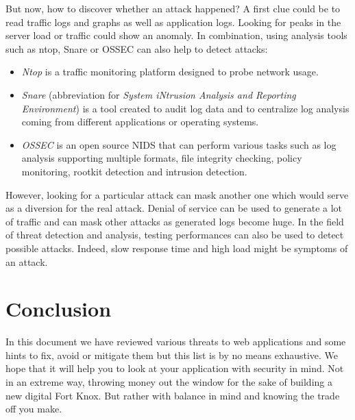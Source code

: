 But now, how to discover whether an attack happened? A first clue could be to read
traffic logs and graphs as well as application logs. Looking for peaks in the
server load or traffic could show an anomaly.
In combination, using analysis tools such as ntop, Snare or OSSEC can also help
to detect attacks:
\begin{itemize}
\item \textit{Ntop} is a traffic monitoring platform designed to probe network usage.
\item \textit{Snare} (abbreviation for \textit{System iNtrusion Analysis and
	Reporting Environment})
	is a tool created to audit log data and to centralize log
	analysis coming from different applications or operating systems.
\item \textit{OSSEC} is an open source NIDS that can perform various tasks such as log
analysis supporting multiple formats, file integrity checking, policy
monitoring, rootkit detection and intrusion detection.
\end{itemize}

However, looking for a particular attack can mask another one which would serve
as a diversion for the real attack. Denial of service can be used to generate a
lot of traffic and can mask other attacks as generated logs become huge. In the
field of threat detection and analysis, testing performances can also be used
to detect possible attacks. Indeed, slow response time and high load might be
symptoms of an attack.

\section{Conclusion}

In this document we have reviewed various threats to web applications
and some hints to fix, avoid or mitigate them but this list is by no
means exhaustive. We hope that it will help you to look at your
application with security in mind. Not in an extreme way, throwing
money out the window for the sake of building a new digital Fort
Knox. But rather with balance in mind and knowing the trade off you
make.
